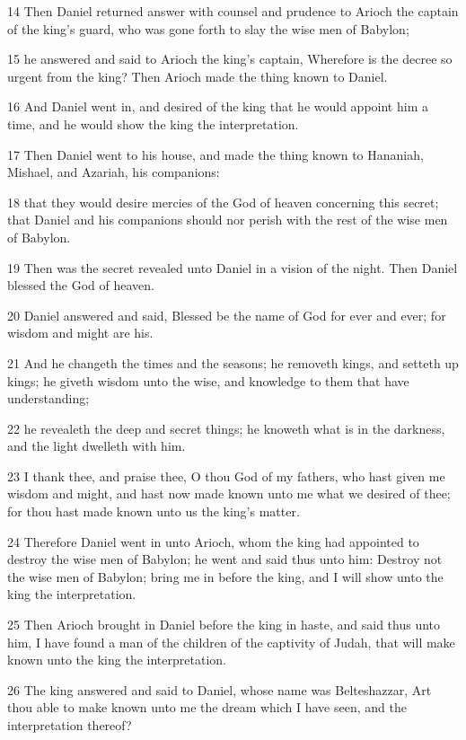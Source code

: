 \par 14 Then Daniel returned answer with counsel and prudence to Arioch the captain of the king's guard, who was gone forth to slay the wise men of Babylon;
\par 15 he answered and said to Arioch the king's captain, Wherefore is the decree so urgent from the king? Then Arioch made the thing known to Daniel.
\par 16 And Daniel went in, and desired of the king that he would appoint him a time, and he would show the king the interpretation.
\par 17 Then Daniel went to his house, and made the thing known to Hananiah, Mishael, and Azariah, his companions:
\par 18 that they would desire mercies of the God of heaven concerning this secret; that Daniel and his companions should nor perish with the rest of the wise men of Babylon.
\par 19 Then was the secret revealed unto Daniel in a vision of the night. Then Daniel blessed the God of heaven.
\par 20 Daniel answered and said, Blessed be the name of God for ever and ever; for wisdom and might are his.
\par 21 And he changeth the times and the seasons; he removeth kings, and setteth up kings; he giveth wisdom unto the wise, and knowledge to them that have understanding;
\par 22 he revealeth the deep and secret things; he knoweth what is in the darkness, and the light dwelleth with him.
\par 23 I thank thee, and praise thee, O thou God of my fathers, who hast given me wisdom and might, and hast now made known unto me what we desired of thee; for thou hast made known unto us the king's matter.
\par 24 Therefore Daniel went in unto Arioch, whom the king had appointed to destroy the wise men of Babylon; he went and said thus unto him: Destroy not the wise men of Babylon; bring me in before the king, and I will show unto the king the interpretation.
\par 25 Then Arioch brought in Daniel before the king in haste, and said thus unto him, I have found a man of the children of the captivity of Judah, that will make known unto the king the interpretation.
\par 26 The king answered and said to Daniel, whose name was Belteshazzar, Art thou able to make known unto me the dream which I have seen, and the interpretation thereof?
